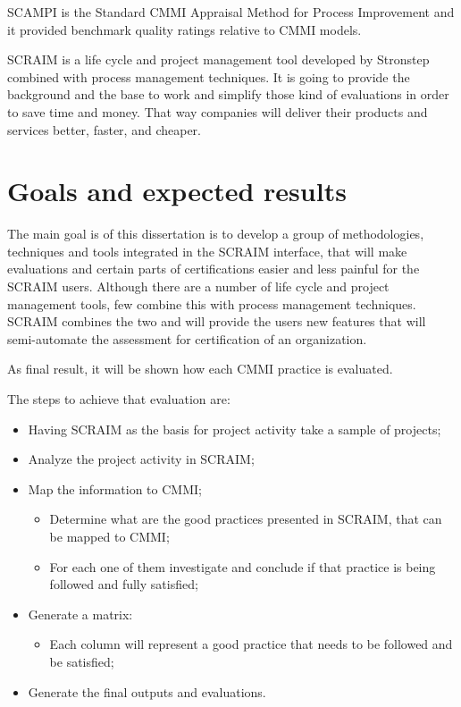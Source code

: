 SCAMPI is the Standard CMMI Appraisal Method for Process Improvement and it provided benchmark quality ratings relative to CMMI models.

SCRAIM is a life cycle and project management tool developed by Stronstep combined with process management techniques. It is going to provide the background and the base to work and simplify those kind of evaluations in order to save time and money. That way companies will deliver their products and services better, faster, and cheaper.

\section{Goals and expected results} \label{sec:goals}

The main goal is of this dissertation is to develop a group of methodologies, techniques and tools integrated in the SCRAIM interface, that will make evaluations and certain parts of certifications easier and less painful for the SCRAIM users.
Although there are a number of life cycle and project management tools, few combine this with process management techniques. SCRAIM combines the two and will provide the users new features that will semi-automate the assessment for certification of an organization. 



As final result, it will be shown how each CMMI practice is evaluated.

The steps to achieve that evaluation are:
\begin{itemize}
	\item Having SCRAIM as the basis for project activity take a sample of projects;
	\item Analyze the project activity in SCRAIM;
	\item Map the information to CMMI;
	\begin{itemize}
		\item Determine what are the good practices presented in SCRAIM, that can be mapped to CMMI;
		\item For each one of them investigate and conclude if that practice is being followed and fully satisfied;
	\end{itemize}
	\item Generate a matrix:
	\begin{itemize}
		\item Each column will represent a good practice that needs to be followed and be satisfied;
	\end{itemize}
	\item Generate the final outputs and evaluations.
\end{itemize}

